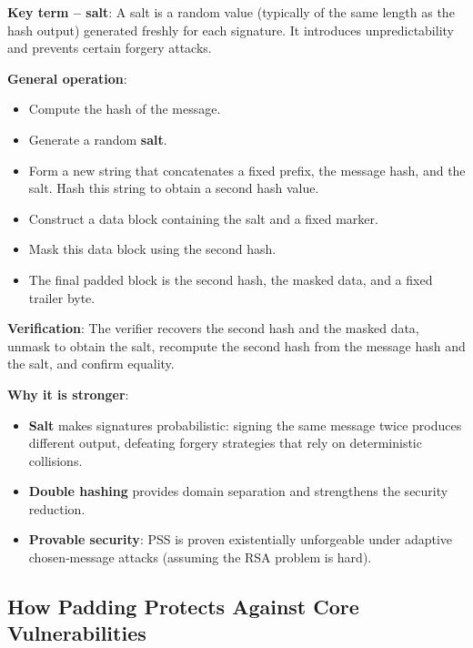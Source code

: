 \textbf{Key term – salt}: A salt is a random value (typically of the same length as the hash output) generated freshly for each signature. It introduces unpredictability and prevents certain forgery attacks.

\noindent\textbf{General operation}:
\begin{itemize}
\item Compute the hash of the message.
\item Generate a random \textbf{salt}.
\item Form a new string that concatenates a fixed prefix, the message hash, and the salt. Hash this string to obtain a second hash value.
\item Construct a data block containing the salt and a fixed marker.
\item Mask this data block using the second hash.
\item The final padded block is the second hash, the masked data, and a fixed trailer byte.
\end{itemize}

\noindent\textbf{Verification}: The verifier recovers the second hash and the masked data, unmask to obtain the salt, recompute the second hash from the message hash and the salt, and confirm equality.

\noindent\textbf{Why it is stronger}:
\begin{itemize}
\item \textbf{Salt} makes signatures probabilistic: signing the same message twice produces different output, defeating forgery strategies that rely on deterministic collisions.
\item \textbf{Double hashing} provides domain separation and strengthens the security reduction.
\item \textbf{Provable security}: PSS is proven existentially unforgeable under adaptive chosen‑message attacks (assuming the RSA problem is hard).
\end{itemize}

\subsection{How Padding Protects Against Core Vulnerabilities}

